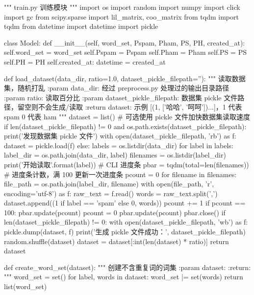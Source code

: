 \documentclass[UTF8,zihao=-4]{ctexart}
\begin{document}
\begin{python}
"""
train.py
训练模块
"""
import os
import random
import numpy
import click
import gc
from scipy.sparse import lil_matrix, coo_matrix
from tqdm import tqdm
from datetime import datetime
import pickle


class Model:
    def __init__(self, word_set, Pspam, Pham, PS, PH, created_at):
        self.word_set = word_set
        self.Pspam = Pspam
        self.Pham = Pham
        self.PS = PS
        self.PH = PH
        self.created_at: datetime = created_at


def load_dataset(data_dir, ratio=1.0, dataset_pickle_filepath=''):
    """
    读取数据集，随机打乱
    :param data_dir:                经过 preprocess.py 处理过的输出目录路径
    :param ratio:                   读取百分比
    :param dataset_pickle_filepath: 数据集 pickle 文件路径，留空则不会生成/读取
    :return dataset:                示例 [(1, ['哈哈', '呵呵'])...]，1 代表 spam 0 代表 ham
    """
    dataset = list()
    # 可选使用 pickle 文件加快数据集读取速度
    if len(dataset_pickle_filepath) != 0 and os.path.exists(dataset_pickle_filepath):
        print('发现数据集 pickle 文件')
        with open(dataset_pickle_filepath, 'rb') as f:
            dataset = pickle.load(f)
    else:
        labels = os.listdir(data_dir)
        for label in labels:
            label_dir = os.path.join(data_dir, label)
            filenames = os.listdir(label_dir)
            print('开始读取{}'.format(label))
            # CLI 进度条
            pbar = tqdm(total=len(filenames))
            # 进度条计数，满 100 更新一次进度条
            pcount = 0
            for filename in filenames:
                file_path = os.path.join(label_dir, filename)
                with open(file_path, 'r', encoding='utf-8') as f:
                    raw_text = f.read()
                words = raw_text.split(',')
                dataset.append((1 if label == 'spam' else 0, words))
                pcount += 1
                if pcount == 100:
                    pbar.update(pcount)
                    pcount = 0
            pbar.update(pcount)
            pbar.close()
        if len(dataset_pickle_filepath) != 0:
            with open(dataset_pickle_filepath, 'wb') as f:
                pickle.dump(dataset, f)
                print('生成 pickle 文件成功：', dataset_pickle_filepath)
    random.shuffle(dataset)
    dataset = dataset[:int(len(dataset) * ratio)]
    return dataset


def create_word_set(dataset):
    """
    创建不含重复词的词集
    :param dataset:
    :return:
    """
    word_set = set()
    for label, words in dataset:
        word_set |= set(words)
    return list(word_set)



\end{python}
\end{document}
